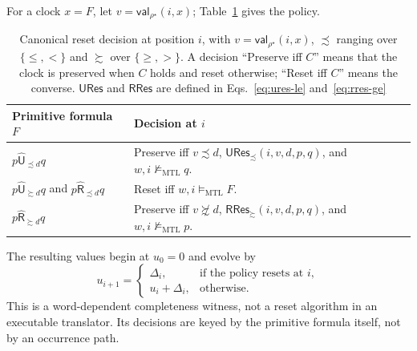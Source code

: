 \documentclass[manuscript]{acmart}
\newcommand{\satM}{\models_{\mathrm{MTL}}}
\newcommand{\hUntil}{\mathbin{\widehat{\mathsf{U}}}}
\newcommand{\hRelease}{\mathbin{\widehat{\mathsf{R}}}}
\newcommand{\CVal}{\mathsf{val}}
\begin{document}
For a clock $x=F$, let $v=\CVal_{\rho^\star}(i,x)$; Table~\ref{tab:canonical-policy} gives the
policy.
\begin{table}[t]
\centering
\caption{Canonical reset decision at position $i$, with
$v=\CVal_{\rho^\star}(i,x)$, $\precsim$ ranging over $\{\le,<\}$ and
$\succsim$ over $\{\ge,>\}$. A decision ``Preserve iff $C$'' means that the
clock is preserved when $C$ holds and reset otherwise; ``Reset iff $C$'' means
the converse. $\mathsf{URes}$ and $\mathsf{RRes}$ are defined in
Eqs.~\eqref{eq:ures-le} and~\eqref{eq:rres-ge}}
\label{tab:canonical-policy}
\begin{tabular}{@{}p{}p{}@{}}
\toprule
Primitive formula $F$ & Decision at $i$\\
\midrule
$p\hUntil_{\precsim d}q$ &
Preserve iff $v\precsim d$, $\mathsf{URes}_{\precsim}(i,v,d,p,q)$, and
$w,i\not\satM q$.\\
$p\hUntil_{\succsim d}q$ and $p\hRelease_{\precsim d}q$ &
Reset iff $w,i\satM F$.\\
$p\hRelease_{\succsim d}q$ &
Preserve iff $v\not\succsim d$, $\mathsf{RRes}_{\succsim}(i,v,d,p,q)$, and
$w,i\not\satM p$.\\
\bottomrule
\end{tabular}
\end{table}
The resulting values begin at $u_0=0$ and evolve by
\[
u_{i+1}=
\begin{cases}
\Delta_i,&\text{if the policy resets at }i,\\
u_i+\Delta_i,&\text{otherwise.}
\end{cases}
\]
This is a word-dependent completeness witness, not a reset algorithm in an
executable translator. Its decisions are keyed by the primitive formula
itself, not by an occurrence path.
\end{document}
